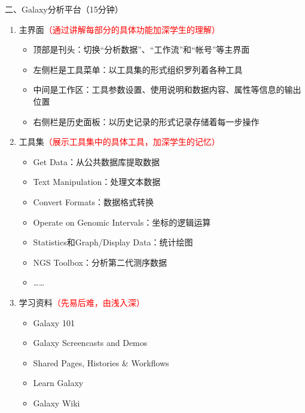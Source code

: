 \documentclass{TIJMUjiaoanLL}
\begin{document}
\vspace*{0.2cm}
\noindent
二、Galaxy分析平台（15分钟）
\begin{enumerate}
  \item 主界面\textcolor{red}{（通过讲解每部分的具体功能加深学生的理解）}
      \begin{itemize}
        \item 顶部是刊头：切换“分析数据”、“工作流”和“帐号”等主界面
        \item 左侧栏是工具菜单：以工具集的形式组织罗列着各种工具
        \item 中间是工作区：工具参数设置、使用说明和数据内容、属性等信息的输出位置
        \item 右侧栏是历史面板：以历史记录的形式记录存储着每一步操作
      \end{itemize}
    \item 工具集\textcolor{red}{（展示工具集中的具体工具，加深学生的记忆）}
      \begin{itemize}
        \item Get Data：从公共数据库提取数据
        \item Text Manipulation：处理文本数据
        \item Convert Formats：数据格式转换
        \item Operate on Genomic Intervals：坐标的逻辑运算
        \item Statistics和Graph/Display Data：统计绘图
        \item NGS Toolbox：分析第二代测序数据
        \item ……
      \end{itemize}
    \item 学习资料\textcolor{red}{（先易后难，由浅入深）}
      \begin{itemize}
        \item Galaxy 101
        \item Galaxy Screencasts and Demos
        \item Shared Pages, Histories \& Workflows
        \item Learn Galaxy
        \item Galaxy Wiki
      \end{itemize}
\end{enumerate}
\end{document}
